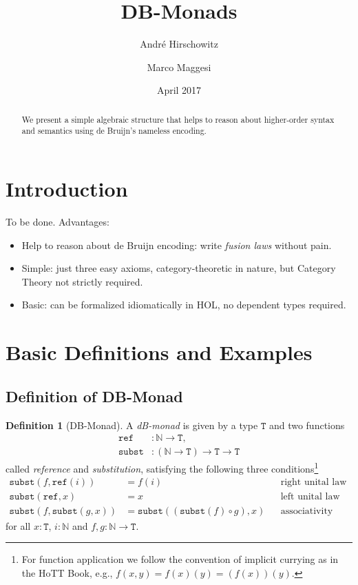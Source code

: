 \documentclass[a4paper,twoside,12pt]{article}
\title{DB-Monads}
\author{Andr\'e Hirschowitz \and Marco Maggesi}
\date{April 2017}
\theoremstyle{definition}
\newtheorem{definition}{Definition}
\theoremstyle{remark}
\newcommand{\NN}{\mathbb{N}}
\newcommand{\subst}{\mathtt{subst}}
\newcommand{\refe}{\mathtt{ref}}
\newcommand{\TT}{\mathtt{T}}
\begin{document}
\maketitle

\begin{abstract}
  We present a simple algebraic structure that helps to reason about
  higher-order syntax and semantics using de Bruijn's nameless
  encoding.
\end{abstract}

\section{Introduction}
\label{sec:intro}
To be done.
Advantages:
\begin{itemize}
\item Help to reason about de Bruijn encoding: write \emph{fusion
    laws} without pain.
\item Simple: just three easy axioms, category-theoretic in nature,
  but Category Theory not strictly required.
\item Basic: can be formalized idiomatically in HOL, no dependent
  types required.
\end{itemize}

\section{Basic Definitions and Examples}
\label{sec:basic-def}

\subsection{Definition of DB-Monad}
\label{sec:basic-defin-example}

\begin{definition}[DB-Monad]
  A \emph{dB-monad} is given by a type $\TT$ and two functions
  \begin{align*}
    \refe &\colon \NN \to \TT, \\
    \subst &\colon (\NN \to \TT) \to \TT \to \TT
  \end{align*}
  called \emph{reference} and \emph{substitution}, satisfying the
  following three conditions\footnote{For function application we
    follow the convention of implicit currying as in the HoTT Book,
    e.g., $f(x,y) = f(x)(y) = (f(x))(y)$.}
  \begin{align*}
    \subst(f,\refe(i)) &=  f(i)
    && \text{right unital law} \\
    \subst(\refe, x) &=  x
    && \text{left unital law} \\
    \subst(f, \subst(g, x)) &= \subst((\subst(f) \circ g), x)
    &&\text{associativity law}
  \end{align*}
  for all $x : \TT$, $i :\NN$ and $f,g\colon \NN \to \TT$.
\end{definition}
\end{document}
